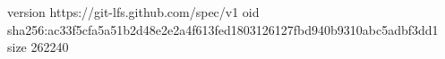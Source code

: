 version https://git-lfs.github.com/spec/v1
oid sha256:ac33f5cfa5a51b2d48e2e2a4f613fed1803126127fbd940b9310abc5adbf3dd1
size 262240
